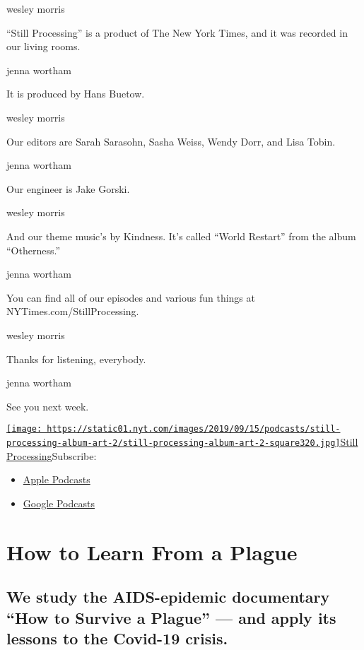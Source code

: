wesley morris

``Still Processing'' is a product of The New York Times, and it was
recorded in our living rooms.

jenna wortham

It is produced by Hans Buetow.

wesley morris

Our editors are Sarah Sarasohn, Sasha Weiss, Wendy Dorr, and Lisa Tobin.

jenna wortham

Our engineer is Jake Gorski.

wesley morris

And our theme music's by Kindness. It's called ``World Restart'' from
the album ``Otherness.''

jenna wortham

You can find all of our episodes and various fun things at
NYTimes.com/StillProcessing.

wesley morris

Thanks for listening, everybody.

jenna wortham

See you next week.

\href{https://www.nytimes.com/column/still-processing-podcast}{\texttt{[image: https://static01.nyt.com/images/2019/09/15/podcasts/still-processing-album-art-2/still-processing-album-art-2-square320.jpg]}Still
Processing}Subscribe:

\begin{itemize}
\tightlist
\item
  \href{https://itunes.apple.com/us/podcast/id1151436460}{Apple
  Podcasts}
\item
  \href{https://www.google.com/podcasts?feed=aHR0cHM6Ly9yc3MuYXJ0MTkuY29tL255dC1zdGlsbC1wcm9jZXNzaW5n}{Google
  Podcasts}
\end{itemize}

\hypertarget{how-to-learn-from-a-plague-1}{%
\section{How to Learn From a
Plague}\label{how-to-learn-from-a-plague-1}}

\hypertarget{we-study-the-aids-epidemic-documentary-how-to-survive-a-plague--and-apply-its-lessons-to-the-covid-19-crisis-1}{%
\subsection{We study the AIDS-epidemic documentary ``How to Survive a
Plague'' --- and apply its lessons to the Covid-19
crisis.}\label{we-study-the-aids-epidemic-documentary-how-to-survive-a-plague--and-apply-its-lessons-to-the-covid-19-crisis-1}}

